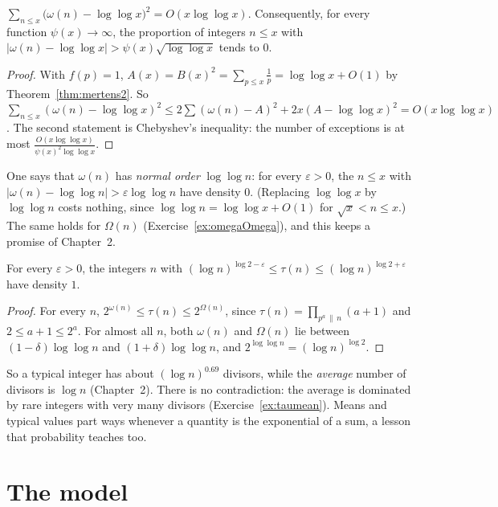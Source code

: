 \begin{theorem}\label{thm:hr}
$\displaystyle\sum_{n\le x}\bigl(\omega(n)-\log\log x\bigr)^2=O(x\log\log x)$. Consequently, for every function $\psi(x)\to\infty$, the proportion of integers $n\le x$ with $|\omega(n)-\log\log x|>\psi(x)\sqrt{\log\log x}$ tends to $0$.
\end{theorem}
\begin{proof}
With $f(p)=1$, $A(x)=B(x)^2=\sum_{p\le x}\frac1p=\log\log x+O(1)$ by Theorem~\ref{thm:mertens2}. So $\sum_{n\le x}(\omega(n)-\log\log x)^2\le2\sum(\omega(n)-A)^2+2x(A-\log\log x)^2=O(x\log\log x)$. The second
statement is Chebyshev's inequality: the number of exceptions is at most $\frac{O(x\log\log x)}{\psi(x)^2\log\log x}$.
\end{proof}

One says that $\omega(n)$ has \emph{normal order} $\log\log n$: for every $\varepsilon>0$, the $n\le x$ with $|\omega(n)-\log\log n|>\varepsilon\log\log n$ have density $0$. (Replacing $\log\log x$ by $\log\log n$ costs nothing,
since $\log\log n=\log\log x+O(1)$ for $\sqrt x<n\le x$.) The same holds for $\Omega(n)$ (Exercise~\ref{ex:omegaOmega}), and this keeps a promise of Chapter~2.

\begin{corollary}\label{cor:taunormal}
For every $\varepsilon>0$, the integers $n$ with $(\log n)^{\log2-\varepsilon}\le\tau(n)\le(\log n)^{\log2+\varepsilon}$ have density $1$.
\end{corollary}
\begin{proof}
For every $n$, $2^{\omega(n)}\le\tau(n)\le2^{\Omega(n)}$, since $\tau(n)=\prod_{p^a\,\|\,n}(a+1)$ and $2\le a+1\le2^a$. For almost all $n$, both $\omega(n)$ and $\Omega(n)$ lie between $(1-\delta)\log\log n$ and $(1+\delta)\log\log n$,
and $2^{\log\log n}=(\log n)^{\log2}$.
\end{proof}

So a typical integer has about $(\log n)^{0.69}$ divisors, while the \emph{average} number of divisors is $\log n$ (Chapter~2). There is no contradiction: the average is dominated by rare integers with
very many divisors (Exercise~\ref{ex:taumean}). Means and typical values part ways whenever a quantity is the exponential of a sum, a lesson that probability teaches too.

\section{The model}

